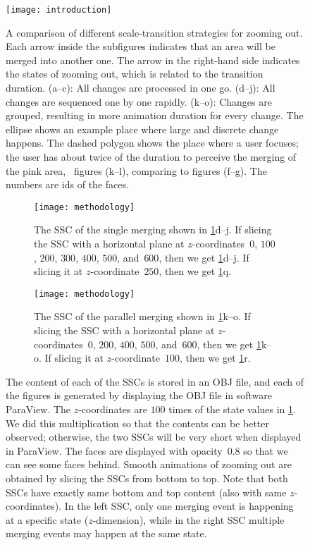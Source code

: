 \documentclass[]{interact}
\begin{document}
\begin{figure}[tb]
\centering
\texttt{[image: introduction]}
\caption{A comparison of different scale-transition strategies for zooming out.
Each arrow inside the subfigures indicates that 
an area will be merged into another one.
The arrow in the right-hand side indicates the states of zooming out,
which is related to the transition duration.
%
(a--c): All changes are processed in one go.
(d--j): All changes are sequenced one by one rapidly.
(k--o): Changes are grouped, resulting in more animation duration for every change.
%
The ellipse shows an example place where large and discrete change happens.
The dashed polygon shows the place where a user focuses;
the user has about twice of the duration 
to perceive the merging of the pink area, \ie~figures (k--l),
comparing to figures (f--g).
The numbers are ids of the faces.
}
\label{fig:intro}
\end{figure}



\begin{figure}
\centering
\begin{subfigure}[t]{0.48\textwidth}
\centering
\texttt{[image: methodology]}
\caption{The SSC of the single merging shown in \figs\ref{fig:intro}d--j.
    If slicing the SSC with a horizontal plane at $z$-coordinates~$0$, 
    $100$, $200$, $300$, $400$, $500$, and~$600$,
    then we get \figs\ref{fig:intro}d--j.
    If slicing it at $z$-coordinate~$250$,
    then we get \fig\ref{fig:intro}q.}
\end{subfigure}
\hfill
\begin{subfigure}[t]{0.48\textwidth}
\centering
\texttt{[image: methodology]}
\caption{The SSC of the parallel merging shown in \figs\ref{fig:intro}k--o.    
    If slicing the SSC with a horizontal plane at $z$-coordinates~$0$, 
    $200$,  $400$, $500$, and~$600$,
    then we get \figs\ref{fig:intro}k--o.
    If slicing it at $z$-coordinate~$100$,
    then we get \fig\ref{fig:intro}r.}
\end{subfigure}
\caption{
The content of each of the SSCs is stored in an OBJ file,
and each of the figures is generated by displaying the OBJ file
in software ParaView.
The $z$-coordinates are $100$ times of the state values in \fig\ref{fig:intro}.
We did this multiplication so that the contents can be better observed;
otherwise, the two SSCs will be very short when displayed in ParaView.
The faces are displayed with opacity~$0.8$ so that we can see some faces behind.
Smooth animations of zooming out are obtained by
slicing the SSCs from bottom to top.
Note that both SSCs have exactly same bottom and top content 
(also with same $z$-coordinates). 
In the left SSC, only one merging event is happening 
at a specific state ($z$-dimension), 
while in the right SSC multiple merging events may happen at the same state.
}
\label{fig:ssc}
\end{figure}
\end{document}
